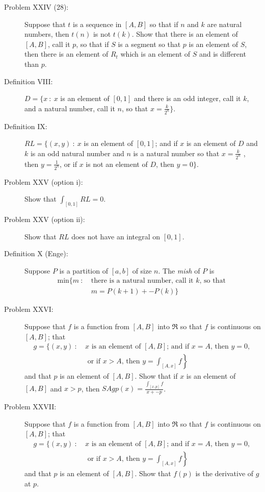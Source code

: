 \documentclass{article}
\begin{document}
\begin{description}
  \item[Problem XXIV (28):] Suppose that $t$ is a sequence in $[A,B]$ so that if $n$ and $k$ are natural numbers, then $t(n)$ is not $t(k)$. Show that there is an element of $[A,B]$, call it $p$, so that if $S$ is a segment so that $p$ is an element of $S$, then there is an element of $R_{t}$ which is an element of $S$ and is different than $p$.

  \item[Definition VIII:] $D = \{ x\ :\ x$ is an element of $[0,1]$ and there is an odd integer, call it $k$, and a natural number, call it $n$, so that $x = \displaystyle{ \frac{k}{2^{n}} } \}$.

  \item[Definition IX:] $RL = \{ (x,y)\ :\ x$ is an element of $[0,1]$; and if $x$ is an element of $D$ and $k$ is an odd natural number and $n$ is a natural number so that $x = \displaystyle{ \frac{k}{2^{n}} }$ , then $y = \displaystyle{ \frac{1}{2^{n}} }$, or if $x$ is not an element of $D$, then $y = 0 \}$.

  \item[Problem XXV (option i):] Show that $\int_{[0,1]} RL = 0$.

  \item[Problem XXV (option ii):] Show that $RL$ does not have an integral on $[0,1]$.

  \item[Definition X (Enge):] Suppose $P$ is a partition of $[a,b]$ of size $n$. The \emph{mish} of $P$ is 
    \begin{align*}
    \text{min} \{ m\ :\ & \text{there is a natural number, call it $k$, so that } \\
                        & m = P(k+1) + -P(k) \}
    \end{align*}

  \item[Problem XXVI:] Suppose that $f$ is a function from $[A,B]$ into $\Re$ so that $f$ is continuous on $[A,B]$; that 
    \begin{align*}
    g = \{ (x,y)\ :\ & x \text{ is an element of $[A,B]$; and if $x=A$, then $y=0$, } \\
                     & \left. \text{ or if $x>A$, then } y = \int_{[A,x]} f \right\}
    \end{align*}
    and that $p$ is an element of $[A,B]$. Show that if $x$ is an element of $[A,B]$ and $x > p$, then $SAgp(x) = \displaystyle{ \frac{\int_{[x,p]} f}{x + -p} }$.

  \item[Problem XXVII:] Suppose that $f$ is a function from $[A,B]$ into $\Re$ so that $f$ is continuous on $[A,B]$; that 
    \begin{align*}
    g = \{ (x,y)\ :\ & x \text{ is an element of $[A,B]$; and if $x=A$, then $y=0$, } \\
                     & \left. \text{ or if $x>A$, then } y = \int_{[A,x]} f \right\}
    \end{align*}
    and that $p$ is an element of $[A,B]$. Show that $f(p)$ is the derivative of $g$ at $p$.


\end{description}
\end{document}
